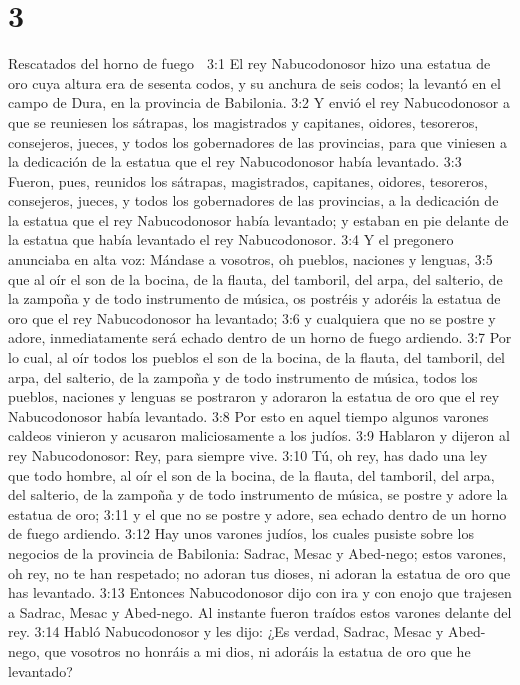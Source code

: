 \chapter{3}

Rescatados del horno de fuego  

3:1 El rey Nabucodonosor hizo una estatua de oro cuya altura era de sesenta codos,  y su anchura de seis codos; la levantó en el campo de Dura, en la provincia de Babilonia.  
3:2 Y envió el rey Nabucodonosor a que se reuniesen los sátrapas, los magistrados y capitanes, oidores, tesoreros, consejeros, jueces, y todos los gobernadores de las provincias, para que viniesen a la dedicación de la estatua que el rey Nabucodonosor había levantado.  
3:3 Fueron, pues, reunidos los sátrapas, magistrados, capitanes, oidores, tesoreros, consejeros, jueces, y todos los gobernadores de las provincias, a la dedicación de la estatua que el rey Nabucodonosor había levantado; y estaban en pie delante de la estatua que había levantado el rey Nabucodonosor.  
3:4 Y el pregonero anunciaba en alta voz: Mándase a vosotros, oh pueblos, naciones y lenguas,  
3:5 que al oír el son de la bocina, de la flauta, del tamboril, del arpa, del salterio, de la zampoña y de todo instrumento de música, os postréis y adoréis la estatua de oro que el rey Nabucodonosor ha levantado;  
3:6 y cualquiera que no se postre y adore, inmediatamente será echado dentro de un horno de fuego ardiendo.  
3:7 Por lo cual, al oír todos los pueblos el son de la bocina, de la flauta, del tamboril, del arpa, del salterio, de la zampoña y de todo instrumento de música, todos los pueblos, naciones y lenguas se postraron y adoraron la estatua de oro que el rey Nabucodonosor había levantado.  
3:8 Por esto en aquel tiempo algunos varones caldeos vinieron y acusaron maliciosamente a los judíos.  
3:9 Hablaron y dijeron al rey Nabucodonosor: Rey, para siempre vive.  
3:10 Tú, oh rey, has dado una ley que todo hombre, al oír el son de la bocina, de la flauta, del tamboril, del arpa, del salterio, de la zampoña y de todo instrumento de música, se postre y adore la estatua de oro;  
3:11 y el que no se postre y adore, sea echado dentro de un horno de fuego ardiendo.  
3:12 Hay unos varones judíos, los cuales pusiste sobre los negocios de la provincia de Babilonia: Sadrac, Mesac y Abed-nego; estos varones, oh rey, no te han respetado; no adoran tus dioses, ni adoran la estatua de oro que has levantado.  
3:13 Entonces Nabucodonosor dijo con ira y con enojo que trajesen a Sadrac, Mesac y Abed-nego. Al instante fueron traídos estos varones delante del rey.  
3:14 Habló Nabucodonosor y les dijo: ¿Es verdad, Sadrac, Mesac y Abed-nego, que vosotros no honráis a mi dios, ni adoráis la estatua de oro que he levantado?  
